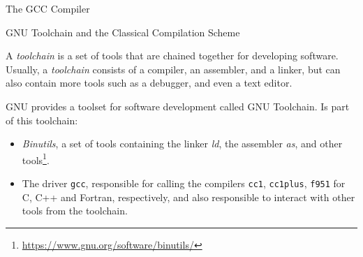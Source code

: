 \begin{section}{The GCC Compiler}
%
%


\begin{subsection}{GNU Toolchain and the Classical Compilation Scheme}

    A \textit{toolchain} is a set of tools that are chained together for
	developing software. Usually, a \textit{toolchain} consists of a
	compiler, an assembler, and a linker, but can also contain more tools
	such as a debugger, and even a text editor.

	GNU provides a toolset for software development called GNU Toolchain.
	Is part of this toolchain:

\begin{itemize}
    \item \textit{Binutils}, a set of tools containing the linker \textit{ld},
	the assembler \textit{as}, and other tools\footnote{\url{https://www.gnu.org/software/binutils/}}.

    \item The driver \texttt{gcc}, responsible for calling the compilers \texttt{cc1},
        \texttt{cc1plus}, \texttt{f951} for C, C++ and Fortran, respectively, and also
		responsible to interact with other tools from the toolchain.


\end{itemize}
\end{subsection}
\end{section}
